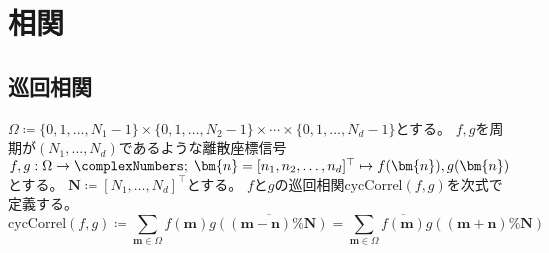 \part{相関}
    \chapter{巡回相関}
        \newcommand{\cycCorrel}[2]{\mathrm{cycCorrel}\left(#1,#2\right)}
        $\Omega \coloneqq \{0,1,\dots,N_1-1\}\times\{0,1,\dots,N_2-1\}\times\cdots\times\{0,1,\dots,N_d-1\}$とする。
        $f,g$を周期が$(N_1,\dots,N_d)$であるような離散座標信号$f,g: \Omega\to\complexNumbers;\;\bm{n} = [n_1,n_2,\dots,n_d]^\top \mapsto f(\bm{n}),g(\bm{n})$とする。
        $\bm{N} \coloneqq [N_1,\dots,N_d]^\top$とする。
        $f$と$g$の巡回相関$\cycCorrel{f}{g}$を次式で定義する。
        \[ \cycCorrel{f}{g} \coloneqq \sum_{\bm{m}\in\Omega} f(\bm{m})\overline{g((\bm{m}-\bm{n})\%\bm{N})} = \sum_{\bm{m}\in\Omega} \overline{f(\bm{m})}g((\bm{m}+\bm{n})\%\bm{N}) \]